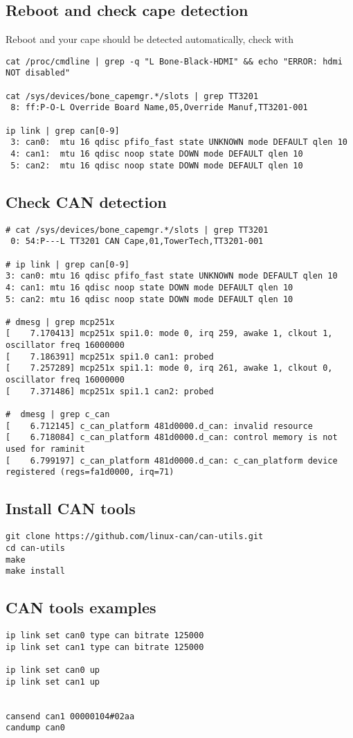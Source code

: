 \subsection{Reboot and check cape detection}
Reboot and your cape should be detected automatically, check with
\begin{lstlisting}
cat /proc/cmdline | grep -q "L Bone-Black-HDMI" && echo "ERROR: hdmi NOT disabled"

cat /sys/devices/bone_capemgr.*/slots | grep TT3201
 8: ff:P-O-L Override Board Name,05,Override Manuf,TT3201-001

ip link | grep can[0-9]
 3: can0:  mtu 16 qdisc pfifo_fast state UNKNOWN mode DEFAULT qlen 10
 4: can1:  mtu 16 qdisc noop state DOWN mode DEFAULT qlen 10
 5: can2:  mtu 16 qdisc noop state DOWN mode DEFAULT qlen 10
\end{lstlisting}

\subsection{Check CAN detection}
\begin{lstlisting}
# cat /sys/devices/bone_capemgr.*/slots | grep TT3201
 0: 54:P---L TT3201 CAN Cape,01,TowerTech,TT3201-001

# ip link | grep can[0-9]
3: can0: mtu 16 qdisc pfifo_fast state UNKNOWN mode DEFAULT qlen 10
4: can1: mtu 16 qdisc noop state DOWN mode DEFAULT qlen 10
5: can2: mtu 16 qdisc noop state DOWN mode DEFAULT qlen 10

# dmesg | grep mcp251x
[    7.170413] mcp251x spi1.0: mode 0, irq 259, awake 1, clkout 1, oscillator freq 16000000
[    7.186391] mcp251x spi1.0 can1: probed
[    7.257289] mcp251x spi1.1: mode 0, irq 261, awake 1, clkout 0, oscillator freq 16000000
[    7.371486] mcp251x spi1.1 can2: probed

#  dmesg | grep c_can  
[    6.712145] c_can_platform 481d0000.d_can: invalid resource
[    6.718084] c_can_platform 481d0000.d_can: control memory is not used for raminit
[    6.799197] c_can_platform 481d0000.d_can: c_can_platform device registered (regs=fa1d0000, irq=71)
\end{lstlisting}


\subsection{Install CAN tools}
\begin{lstlisting}
git clone https://github.com/linux-can/can-utils.git
cd can-utils
make
make install
\end{lstlisting}

\subsection{CAN tools examples}
\begin{lstlisting}
ip link set can0 type can bitrate 125000
ip link set can1 type can bitrate 125000

ip link set can0 up
ip link set can1 up


cansend can1 00000104#02aa
candump can0
\end{lstlisting}
